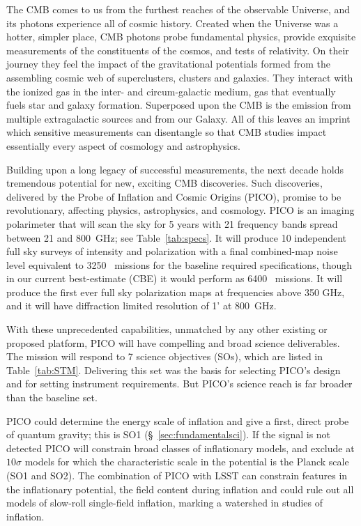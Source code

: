 \documentclass[PICOReport.tex]{subfiles}
\begin{document}

The \ac{CMB} comes to us from the furthest reaches of the observable Universe, and its photons experience all of cosmic history.  Created when the Universe was a hotter, simpler place, CMB photons probe fundamental physics, provide exquisite measurements of the constituents of the cosmos, and tests of relativity.  On their journey they feel the impact of the gravitational potentials formed from the assembling cosmic web of superclusters, clusters and galaxies.  They interact with the ionized gas in the inter- and circum-galactic medium, gas that eventually fuels star and galaxy formation.  Superposed upon the CMB is the emission from multiple extragalactic sources and from our Galaxy.  All of this leaves an imprint which sensitive measurements can disentangle so that CMB studies impact essentially every aspect of cosmology and astrophysics.

Building upon a long legacy of successful measurements, the next decade holds tremendous potential for new, exciting \ac{CMB} discoveries.  Such discoveries, delivered by the Probe of Inflation and Cosmic Origins (PICO), promise to be revolutionary, affecting physics, astrophysics, and cosmology. PICO is an imaging polarimeter that will scan the sky for 5 years with 21 frequency bands spread between 21 and 800~GHz; see Table~\ref{tab:specs}. It will produce 10 independent full sky surveys of intensity and polarization with a final combined-map noise level equivalent to 3250 \planck\ missions for the baseline required specifications, though in our current best-estimate (CBE) it would perform as 6400 \planck\ missions.  It will produce the first ever full sky polarization maps at frequencies above 350 GHz, and it will have diffraction limited resolution of 1' at 800~GHz. 

With these unprecedented capabilities, unmatched by any other existing or proposed platform, PICO will have compelling and broad science deliverables. The mission will respond to 7 science objectives (SOs), which are listed in Table~\ref{tab:STM}. Delivering this set was the basis for selecting PICO's design and for setting instrument requirements. But PICO's science reach is far broader than the baseline set. 

PICO could determine the energy scale of inflation and give a first, direct probe of quantum gravity; this is SO1 (\S~\ref{sec:fundamentalsci}). If the signal is not detected PICO will constrain broad classes of inflationary models, and exclude at $10\sigma$ models for which the characteristic scale in the potential is the Planck scale (SO1 and SO2). The combination of PICO with LSST can constrain features in the inflationary potential, the field content during inflation and could rule out all models of slow-roll single-field inflation, marking a watershed in studies of inflation. 
\end{document}
